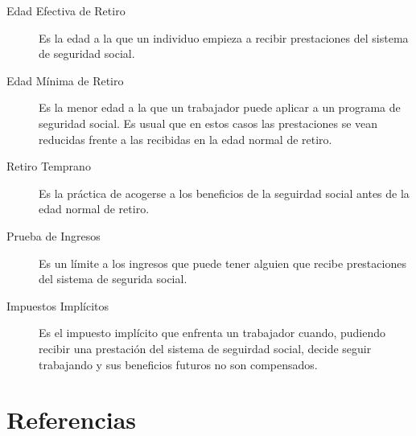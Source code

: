 \documentclass[]{article}
\begin{document}
\begin{description}
\item[Edad Efectiva de Retiro]
Es la edad a la que un individuo empieza a recibir prestaciones del
sistema de seguridad social.
\item[Edad Mínima de Retiro]
Es la menor edad a la que un trabajador puede aplicar a un programa de
seguridad social. Es usual que en estos casos las prestaciones se vean
reducidas frente a las recibidas en la edad normal de retiro.
\item[Retiro Temprano]
Es la práctica de acogerse a los beneficios de la seguirdad social antes
de la edad normal de retiro.
\item[Prueba de Ingresos]
Es un límite a los ingresos que puede tener alguien que recibe
prestaciones del sistema de segurida social.
\item[Impuestos Implícitos]
Es el impuesto implícito que enfrenta un trabajador cuando, pudiendo
recibir una prestación del sistema de seguirdad social, decide seguir
trabajando y sus beneficios futuros no son compensados.
\end{description}

\hypertarget{referencias}{%
\section{Referencias}\label{referencias}}
\end{document}
